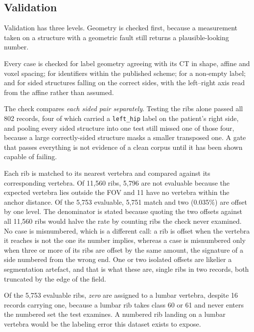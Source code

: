 \documentclass[aapm,mph,amsmath,amssymb,preprint,linenumbers]{revtex4-2}
\begin{document}
\subsection{Validation}
\label{sec:validation}


Validation has three levels. Geometry is checked first, because a measurement taken on a
structure with a geometric fault still returns a plausible-looking number.

Every case is checked for label geometry agreeing with its CT in
shape, affine and voxel spacing; for identifiers within the published scheme; for a non-empty
label; and for sided structures falling on the correct sides, with the left--right axis read
from the affine rather than assumed. 

The check compares \emph{each sided pair separately}. Testing the ribs alone passed all 802
records, four of which carried a \texttt{left\_hip} label on the patient's right side, and
pooling every sided structure into one test still missed one of those four, because a large
correctly-sided structure masks a smaller transposed one. A gate that passes everything is not
evidence of a clean corpus until it has been shown capable of failing.

Each rib is matched to its nearest vertebra and compared
against its corresponding vertebra. Of 11{,}560 ribs, 5{,}796 are not evaluable
because the expected vertebra lies outside the FOV and 11 have no vertebra within
the anchor distance. Of the 5{,}753 evaluable, 5{,}751 match and two (0.035\%) are offset by
one level. The denominator is stated because quoting the two offsets against all 11{,}560
ribs would halve the rate by counting ribs the check never examined. No case is misnumbered,
which is a different call: a rib is offset when the vertebra it reaches is not the one its
number implies, whereas a case is misnumbered only when three or more of its ribs are offset by
the same amount, the signature of a side numbered from the wrong end. One or two isolated
offsets are likelier a segmentation artefact, and that is what these are, single ribs in two
records, both truncated by the edge of the field.

Of the 5{,}753 evaluable ribs, \emph{zero} are assigned to a lumbar vertebra, despite 16 records
carrying one, because a lumbar rib takes class 60 or 61 and never enters the numbered set the
test examines. A numbered rib landing on a lumbar vertebra would be the labeling error this
dataset exists to expose.
\end{document}
